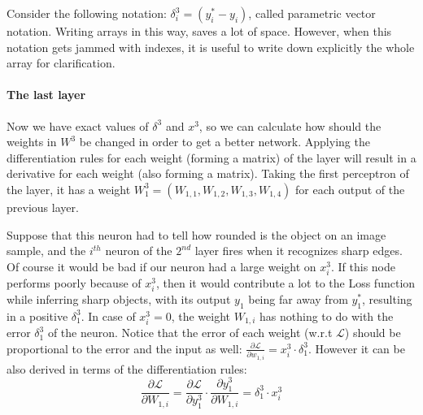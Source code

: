 Consider the following notation:
$
    \delta^3_i = (y^*_i - y_i)
$, 
called parametric vector notation. Writing arrays in this way, saves a lot of space. However, when this notation gets jammed with indexes, it is useful to write down explicitly the whole array for clarification.

\paragraph{The last layer} Now we have exact values of $\delta^3$ and $x^3$, so we can calculate how should the weights in $W^3$ be changed in order to get a better network.
Applying the differentiation rules for each weight (forming a matrix) of the layer will result in a derivative for each weight (also forming a matrix).
Taking the first perceptron of the layer, it has a weight $W^3_1=(W_{1,1}, W_{1,2}, W_{1,3}, W_{1,4})$ for each output of the previous layer.

Suppose that this neuron had to tell how rounded is the object on an image sample, 
and the $i^{th}$ neuron of the $2^{nd}$ layer fires when it recognizes sharp edges.
Of course it would be bad if our neuron had a large weight on $x^3_i$. 
If this node performs poorly because of $x^3_i$, then it would contribute a lot to the Loss function while inferring sharp objects, with its output $y_1$ being far away from $y^*_1$, resulting in a positive $\delta^3_1$. 
In case of $x^3_i = 0$, the weight $W_{1,i}$ has nothing to do with the error $\delta^3_1$ of the neuron.
Notice that the error of each weight (w.r.t $\mathcal{L}$) should be proportional to the error and the input as well: $\frac{\partial \mathcal{L}}{\partial w_{1,i}}=x^3_i \cdot \delta^3_1$.
However it can be also derived in terms of the differentiation rules: 
$$
    \frac{\partial \mathcal{L}}{\partial W_{1,i}}=
    \frac{\partial \mathcal{L}}{\partial y^3_1}\cdot \frac{\partial y^3_1}{\partial W_{1,i}} =
     \delta^3_1  \cdot x^3_i
$$

